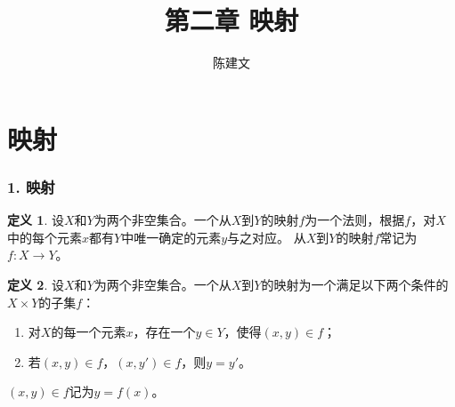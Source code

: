 \documentclass{beamer}
\begin{document}
\begin{CJK*}{UTF8}{gbsn}

\newtheorem{Thm}{定理}[section]
\newtheorem{Cor}{推论}[section]
\theoremstyle{definition}
\newtheorem{Def}{定义}[section]
\theoremstyle{example}
\newtheorem*{Ex}{例：}
\newtheorem*{Exercise}{习题}

\date{}
\author{陈建文}

\title{第二章 映射}
\begin{frame}
  \titlepage
\end{frame}  
\section{映射}
\begin{frame}
  \frametitle{1. 映射}
  
  \begin{Def}
    设$X$和$Y$为两个非空集合。一个从$X$到$Y$的\alert{映射}$f$为一个法则，根据$f$，对$X$中的每个元素$x$都有$Y$中唯一确定的元素$y$与之对应。
    从$X$到$Y$的映射$f$常记为$f:X\to Y$。
  \end{Def}\pause

  \begin{Def}
    设$X$和$Y$为两个非空集合。一个从$X$到$Y$的映射为一个满足以下两个条件的$X\times Y$的子集$f$：
    \begin{enumerate}
    \item 对$X$的每一个元素$x$，存在一个$y\in Y$，使得$(x,y) \in f$；
    \item 若$(x,y)\in f$，$(x,y')\in f$，则$y=y'$。
    \end{enumerate}
    $(x,y)\in f$记为$y=f(x)$。
  \end{Def}\pause


\end{frame}
\end{CJK*}
\end{document}
